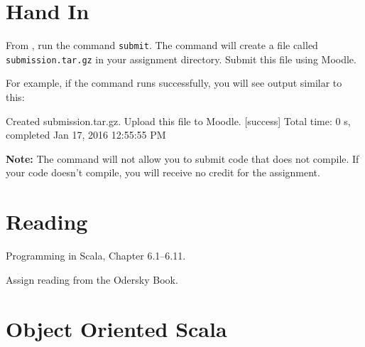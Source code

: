 \documentclass{book}
\begin{document}
\section{Hand In}

From \sbt{}, run the command \verb|submit|. The command will create
a file called \verb|submission.tar.gz| in your assignment directory.
Submit this file using Moodle.

For example, if the command runs successfully, you will see output similar
to this:
%
\begin{console}
Created submission.tar.gz. Upload this file to Moodle.
[success] Total time: 0 s, completed Jan 17, 2016 12:55:55 PM
\end{console}

\textbf{Note:}  The command will not allow you to submit code that does not
compile. If your code doesn't compile, you will receive no credit for the
assignment.

\newlecture

\section{Reading}

Programming in Scala, Chapter 6.1--6.11.


\begin{instructor}
Assign reading from the Odersky Book.
\end{instructor}

\section{Object Oriented Scala}
\end{document}
